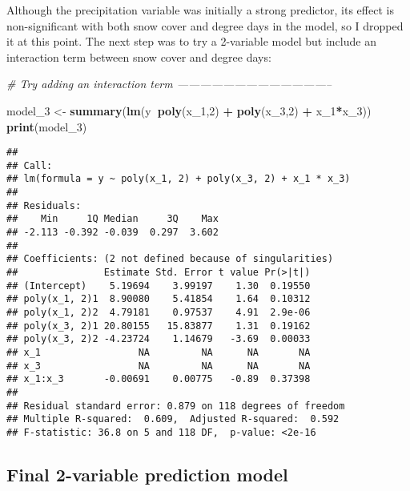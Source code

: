 \documentclass[]{article}
\newenvironment{Shaded}{\begin{snugshade}}{\end{snugshade}}
\newcommand{\CommentTok}[1]{\textcolor[rgb]{0.56,0.35,0.01}{\textit{#1}}}
\newcommand{\DecValTok}[1]{\textcolor[rgb]{0.00,0.00,0.81}{#1}}
\newcommand{\KeywordTok}[1]{\textcolor[rgb]{0.13,0.29,0.53}{\textbf{#1}}}
\newcommand{\NormalTok}[1]{#1}
\newcommand{\OperatorTok}[1]{\textcolor[rgb]{0.81,0.36,0.00}{\textbf{#1}}}
\newcommand{\StringTok}[1]{\textcolor[rgb]{0.31,0.60,0.02}{#1}}
\begin{document}
Although the precipitation variable was initially a strong predictor,
its effect is non-significant with both snow cover and degree days in
the model, so I dropped it at this point. The next step was to try a
2-variable model but include an interaction term between snow cover and
degree days:

\begin{Shaded}
\begin{Highlighting}[]
\CommentTok{# Try adding an interaction term -----------------------------------------}

\NormalTok{model_}\DecValTok{3}\NormalTok{ <-}\StringTok{ }\KeywordTok{summary}\NormalTok{(}\KeywordTok{lm}\NormalTok{(y}\OperatorTok{~}\KeywordTok{poly}\NormalTok{(x_}\DecValTok{1}\NormalTok{,}\DecValTok{2}\NormalTok{) }\OperatorTok{+}\StringTok{ }\KeywordTok{poly}\NormalTok{(x_}\DecValTok{3}\NormalTok{,}\DecValTok{2}\NormalTok{) }\OperatorTok{+}\StringTok{ }\NormalTok{x_}\DecValTok{1}\OperatorTok{*}\NormalTok{x_}\DecValTok{3}\NormalTok{))}
\KeywordTok{print}\NormalTok{(model_}\DecValTok{3}\NormalTok{)}
\end{Highlighting}
\end{Shaded}

\begin{verbatim}
## 
## Call:
## lm(formula = y ~ poly(x_1, 2) + poly(x_3, 2) + x_1 * x_3)
## 
## Residuals:
##    Min     1Q Median     3Q    Max 
## -2.113 -0.392 -0.039  0.297  3.602 
## 
## Coefficients: (2 not defined because of singularities)
##               Estimate Std. Error t value Pr(>|t|)
## (Intercept)    5.19694    3.99197    1.30  0.19550
## poly(x_1, 2)1  8.90080    5.41854    1.64  0.10312
## poly(x_1, 2)2  4.79181    0.97537    4.91  2.9e-06
## poly(x_3, 2)1 20.80155   15.83877    1.31  0.19162
## poly(x_3, 2)2 -4.23724    1.14679   -3.69  0.00033
## x_1                 NA         NA      NA       NA
## x_3                 NA         NA      NA       NA
## x_1:x_3       -0.00691    0.00775   -0.89  0.37398
## 
## Residual standard error: 0.879 on 118 degrees of freedom
## Multiple R-squared:  0.609,  Adjusted R-squared:  0.592 
## F-statistic: 36.8 on 5 and 118 DF,  p-value: <2e-16
\end{verbatim}

\hypertarget{final-2-variable-prediction-model}{%
\subsection{Final 2-variable prediction
model}\label{final-2-variable-prediction-model}}
\end{document}
